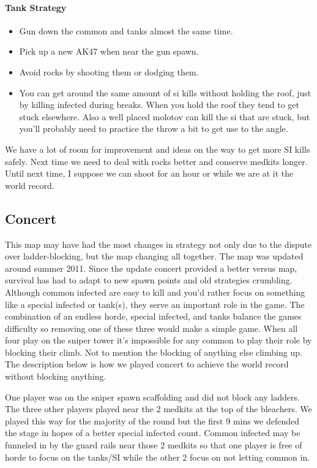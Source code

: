 \paragraph{Tank Strategy}
\begin{itemize}
\item Gun down the common and tanks almost the same time.
\item Pick up a new AK47 when near the gun spawn.
\item Avoid rocks by shooting them or dodging them.
\item You can get around the same amount of si kills without holding the roof, just by killing infected during breaks. When you hold the roof they tend to get stuck elsewhere. Also a well placed molotov can kill the si that are stuck, but you'll probably need to practice the throw a bit to get use to the angle.
\end{itemize}
We have a lot of room for improvement and ideas on the way to get more SI kills safely. Next time we need to deal with rocks better and conserve medkits longer. Until next time, I suppose we can shoot for an hour or while we are at it the world record.

\subsection{Concert}
This map may have had the most changes in strategy not only due to the dispute over ladder-blocking, but the map changing all together. The map was updated around summer 2011. Since the update concert provided a better versus map, survival has had to adapt to new spawn points and old strategies crumbling. Although common infected are easy to kill and you'd rather focus on something like a special infected or tank(s), they serve an important role in the game. The combination of an endless horde, special infected, and tanks balance the games difficulty so removing one of these three would make a simple game. When all four play on the sniper tower it’s impossible for any common to play their role by blocking their climb. Not to mention the blocking of anything else climbing up. The description below is how we played concert to achieve the world record without blocking anything.

One player was on the sniper spawn scaffolding and did not block any ladders. The three other players played near the 2 medkits at the top of the bleachers. We played this way for the majority of the round but the first 9 mins we defended the stage in hopes of a better special infected count. Common infected may be funneled in by the guard rails near those 2 medkits so that one player is free of horde to focus on the tanks/SI while the other 2 focus on not letting common in. 

